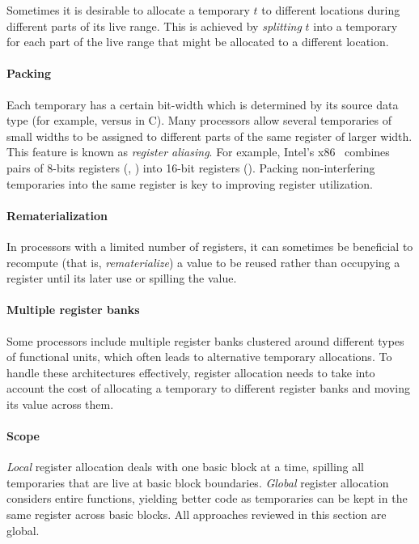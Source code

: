 \documentclass[acmsmall,authorversion,nonacm]{acmart}
\begin{document}
Sometimes it is desirable to allocate a temporary $t$ to different
locations during different parts of its live range.
This is achieved by \emph{splitting} $t$ into a temporary for each
part of the live range that might be allocated to a different
location.

\paragraph{Packing}

Each temporary has a certain bit-width which is determined by its
source data type (for example,  versus  in C).
Many processors allow several temporaries of small widths to be
assigned to different parts of the same register of larger width.
This feature is known as \emph{register aliasing}.
For example, Intel's x86~\cite{x86} combines pairs of 8-bits
registers (, ) into 16-bit registers
().
Packing non-interfering temporaries into the same register is key to
improving register utilization.

\paragraph{Rematerialization}

In processors with a limited number of registers, it can sometimes be
beneficial to recompute (that is, \emph{rematerialize}) a value to be
reused rather than occupying a register until its later use or
spilling the value.

\paragraph{Multiple register banks}

Some processors include multiple register banks clustered around
different types of functional units, which often leads to alternative
temporary allocations.
To handle these architectures effectively, register allocation needs
to take into account the cost of allocating a temporary to different
register banks and moving its value across them.

\paragraph{Scope}

\emph{Local} register allocation deals with one basic block at a time,
spilling all temporaries that are live at basic block boundaries.
\emph{Global} register allocation considers entire functions, yielding
better code as temporaries can be kept in the same register across
basic blocks.
All approaches reviewed in this section are global.
\end{document}

